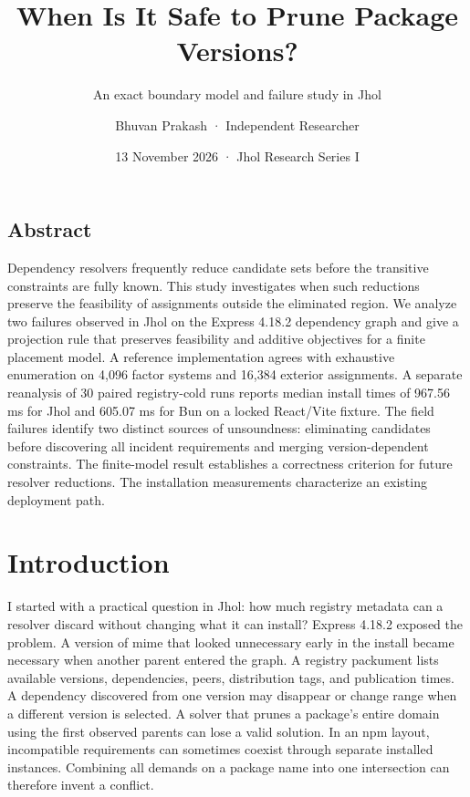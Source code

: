 \documentclass[
  11pt,
  letterpaper,
]{article}
\title{When Is It Safe to Prune Package Versions?}
\subtitle{An exact boundary model and failure study in Jhol}
\author{Bhuvan Prakash · Independent Researcher}
\date{13 November 2026 · Jhol Research Series I}
\begin{document}
\maketitle

\subsection*{Abstract}\label{abstract}

Dependency resolvers frequently reduce candidate sets before the
transitive constraints are fully known. This study investigates when
such reductions preserve the feasibility of assignments outside the
eliminated region. We analyze two failures observed in Jhol on the
Express 4.18.2 dependency graph and give a projection rule that
preserves feasibility and additive objectives for a finite placement
model. A reference implementation agrees with exhaustive enumeration on
4,096 factor systems and 16,384 exterior assignments. A separate
reanalysis of 30 paired registry-cold runs reports median install times
of 967.56 ms for Jhol and 605.07 ms for Bun on a locked React/Vite
fixture. The field failures identify two distinct sources of
unsoundness: eliminating candidates before discovering all incident
requirements and merging version-dependent constraints. The finite-model
result establishes a correctness criterion for future resolver
reductions. The installation measurements characterize an existing
deployment path.

\section{Introduction}\label{introduction}

I started with a practical question in Jhol: how much registry metadata
can a resolver discard without changing what it can install? Express
4.18.2 exposed the problem. A version of mime that looked unnecessary
early in the install became necessary when another parent entered the
graph. A registry packument lists available versions, dependencies,
peers, distribution tags, and publication times. A dependency discovered
from one version may disappear or change range when a different version
is selected. A solver that prunes a package's entire domain using the
first observed parents can lose a valid solution. In an npm layout,
incompatible requirements can sometimes coexist through separate
installed instances. Combining all demands on a package name into one
intersection can therefore invent a conflict.
\end{document}
